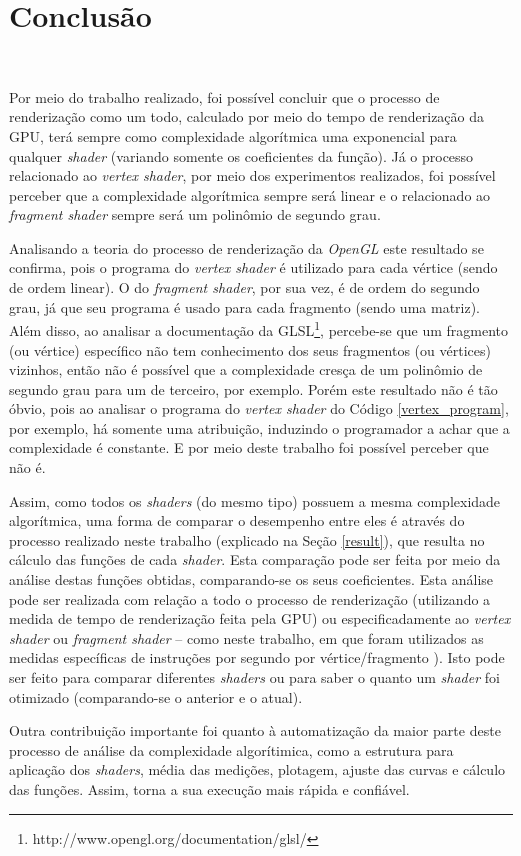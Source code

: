 \chapter[Conclusao]{Conclusão}\

	Por meio do trabalho realizado, foi possível concluir que o processo de renderização como um todo, calculado por meio do tempo de renderização da GPU, terá sempre como complexidade algorítmica uma exponencial para qualquer \textit{shader} (variando somente os coeficientes da função).  Já o processo relacionado ao \textit{vertex shader}, por meio dos experimentos realizados, foi possível perceber que a complexidade algorítmica sempre será linear e o relacionado ao \textit{fragment shader} sempre será um polinômio de segundo grau.

	Analisando a teoria do processo de renderização da \textit{OpenGL} este resultado se confirma, pois o programa do \textit{vertex shader} é utilizado para cada vértice (sendo de ordem linear).  O do \textit{fragment shader}, por sua vez, é de ordem do segundo grau, já que seu programa é usado para cada fragmento (sendo uma matriz). Além disso, ao analisar a documentação da GLSL\footnote{http://www.opengl.org/documentation/glsl/}, percebe-se que um fragmento (ou vértice) específico não tem conhecimento dos seus fragmentos (ou vértices) vizinhos, então não é possível que a complexidade cresça de um polinômio de segundo grau para um de terceiro, por exemplo. Porém este resultado não é tão óbvio, pois ao analisar o programa do \textit{vertex shader} do Código \ref{vertex_program}, por exemplo, há somente uma atribuição, induzindo o programador  a achar que a complexidade é constante. E por meio deste trabalho foi possível perceber que não é.

	 
	
	Assim, como todos os \textit{shaders} (do mesmo tipo) possuem a mesma complexidade algorítmica, uma forma de comparar o desempenho entre eles é através do processo realizado neste trabalho (explicado na Seção \ref{result}), que resulta no cálculo das funções de cada \textit{shader}. Esta comparação pode ser feita por meio da análise destas funções obtidas, comparando-se os seus coeficientes. Esta análise pode ser realizada com relação a todo o processo de renderização (utilizando a medida de tempo de renderização feita pela GPU) ou especificadamente ao \textit{vertex shader} ou \textit{fragment shader} -- como neste trabalho, em que foram utilizados as medidas específicas de instruções por segundo por vértice/fragmento ).  Isto pode ser feito para comparar diferentes \textit{shaders} ou para saber o quanto um \textit{shader} foi otimizado (comparando-se o anterior e o atual). 

	Outra contribuição importante foi quanto à automatização da maior parte deste processo de análise da complexidade algorítimica, como a estrutura para aplicação dos \textit{shaders}, média das medições, plotagem, ajuste das curvas e cálculo das funções. Assim, torna a sua execução mais rápida e confiável. 
